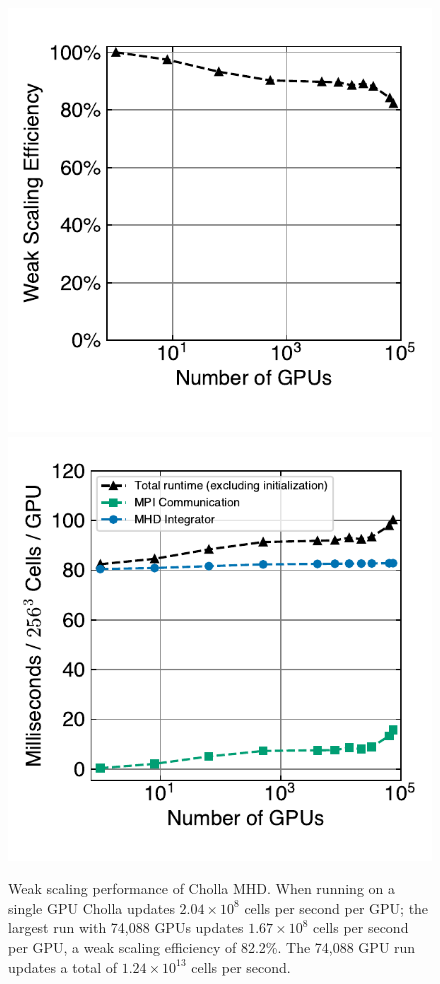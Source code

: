 \begin{figure}[ht!]
    \includegraphics[width=0.5\linewidth]{assets/3-mhd-tests/scaling_tests_weak_efficiency.pdf}
    \includegraphics[width=0.5\linewidth]{assets/3-mhd-tests/scaling_tests_ms_per_gpu.pdf}
    \caption{Weak scaling performance of Cholla MHD. When running on a single GPU Cholla updates $2.04\times10^8$ cells per second per GPU; the largest run with 74,088 GPUs updates $1.67\times10^8$ cells per second per GPU, a weak scaling efficiency of 82.2\%. The 74,088 GPU run updates a total of $1.24\times10^{13}$ cells per second. }
    \label{fig:scaling-weak-efficiency}
\end{figure}
